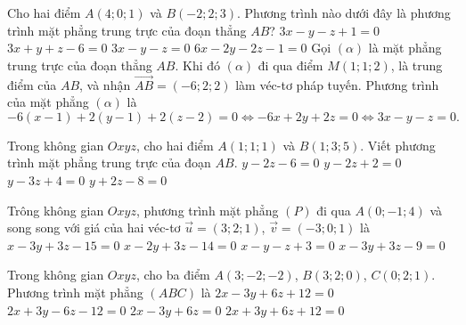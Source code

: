 \begin{ex}%
	Cho hai điểm $A(4;0;1)$ và $B(-2;2;3)$. Phương trình nào dưới đây là phương trình mặt phẳng trung trực của đoạn thẳng $AB$?
	\choice
	{$3x-y-z+1=0$}
	{$3x+y+z-6=0$}
	{\True $3x-y-z=0$}
	{$6x-2y-2z-1=0$}
	\loigiai
	{
		Gọi $(\alpha)$ là mặt phẳng trung trực của đoạn thẳng $AB$. Khi đó $(\alpha)$ đi qua điểm $M(1;1;2)$, là trung điểm của $AB$, và nhận $\overrightarrow{AB}=(-6;2;2)$ làm véc-tơ pháp tuyến. Phương trình của mặt phẳng $(\alpha)$ là
		$$-6(x-1)+2(y-1)+2(z-2)=0 \Leftrightarrow -6x+2y+2z=0 \Leftrightarrow 3x-y-z=0.$$
	}
\end{ex}
\begin{ex}
	Trong không gian $Oxyz$, cho hai điểm $A(1;1;1)$ và $B(1;3;5)$. Viết phương trình mặt phẳng trung trực của đoạn $AB$.
	\choice
	{$y-2z-6=0$}
	{$y-2z+2=0$}
	{$y-3z+4=0$}
	{\True $y+2z-8=0$}
\end{ex}
\begin{ex}%
	Trông không gian $Oxyz$, phương trình mặt phẳng $(P)$ đi qua $A(0;-1;4)$ và song song với giá của hai véc-tơ $\vec{u}=(3;2;1)$, $\vec{v}=(-3;0;1)$ là
	\choice
	{\True $x-3y+3z-15=0$}
	{$x-2y+3z-14=0$}
	{$x-y-z+3=0$}
	{$x-3y+3z-9=0$}
\end{ex}
\begin{ex}
	Trong không gian $Oxyz$, cho ba điểm $A(3;-2;-2)$, $B(3;2;0)$, $C(0;2;1)$. Phương trình mặt phẳng $(ABC)$ là
	\choice
	{$2x-3y+6z+12=0$}
	{$2x+3y-6z-12=0$}
	{\True $2x-3y+6z=0$}
	{$2x+3y+6z+12=0$}
\end{ex}


